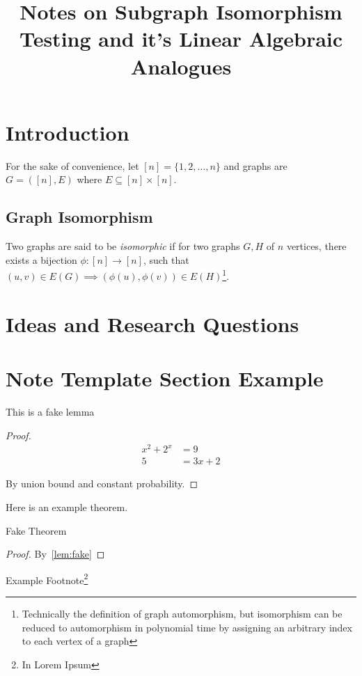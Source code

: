 \documentclass[12pt]{article}
\title{
    Notes on Subgraph Isomorphism Testing and it's Linear Algebraic Analogues
}
\author{}
\date{}
\begin{document}
\maketitle

\section{Introduction}

For the sake of convenience, let $[n] = \{ 1, 2, \ldots, n \}$ and graphs are $G=([n], E)$ where $E \subseteq [n]{\times}[n]$.

\subsection{Graph Isomorphism}

Two graphs are said to be \textit{isomorphic} if for two graphs $G, H$ of $n$ vertices, there exists a bijection $\phi : [n] \to [n]$, such that $(u,v)\in E(G) \implies (\phi(u),\phi(v)) \in E(H)$\footnote{Technically the definition of graph automorphism, but isomorphism can be reduced to automorphism in polynomial time by assigning an arbitrary index to each vertex of a graph}.



\section{Ideas and Research Questions}



\section{Note Template Section Example}

\begin{lemma}\label{lem:fake}
	This is a fake lemma
\end{lemma}

\begin{proof}
	\begin{align*}
		x^{2} + 2^{x} & = 9      \\
		5             & = 3x + 2
	\end{align*}

	By union bound and constant probability.
\end{proof}

Here is an example theorem.

\begin{theorem}\label{thm:fake}
	Fake Theorem
\end{theorem}

\begin{proof}
	By~\cref{lem:fake}
\end{proof}

Example Footnote\footnote{In Lorem Ipsum}
\end{document}
